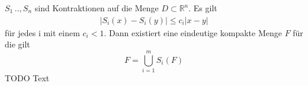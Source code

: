 $S_1_...,S_n$ sind Kontraktionen auf die Menge $D \subset \mathbb{R}^n$. Es gilt
\begin{align}
	|S_i(x) - S_i(y)| \leq c_i|x - y|
\end{align}
für jedes i mit einem $c_i < 1$. Dann existiert eine eindeutige kompakte Menge $F$ für die gilt
\begin{equation}
	F = \bigcup\limits_{i = 1}^{m} S_i(F)
\end{equation}
TODO Text
